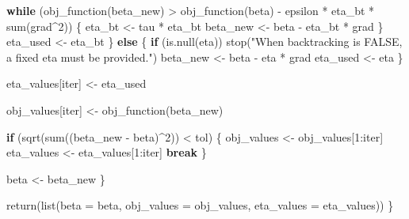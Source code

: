 \documentclass[
  letterpaper,
  DIV=11,
  numbers=noendperiod]{scrartcl}
\newenvironment{Shaded}{\begin{snugshade}}{\end{snugshade}}
\newcommand{\AttributeTok}[1]{\textcolor[rgb]{0.40,0.45,0.13}{#1}}
\newcommand{\ControlFlowTok}[1]{\textcolor[rgb]{0.00,0.23,0.31}{\textbf{#1}}}
\newcommand{\DecValTok}[1]{\textcolor[rgb]{0.68,0.00,0.00}{#1}}
\newcommand{\FunctionTok}[1]{\textcolor[rgb]{0.28,0.35,0.67}{#1}}
\newcommand{\NormalTok}[1]{\textcolor[rgb]{0.00,0.23,0.31}{#1}}
\newcommand{\OtherTok}[1]{\textcolor[rgb]{0.00,0.23,0.31}{#1}}
\newcommand{\SpecialCharTok}[1]{\textcolor[rgb]{0.37,0.37,0.37}{#1}}
\newcommand{\StringTok}[1]{\textcolor[rgb]{0.13,0.47,0.30}{#1}}
\begin{document}
\begin{Shaded}
\begin{Highlighting}[]
      \ControlFlowTok{while}\NormalTok{ (}\FunctionTok{obj\_function}\NormalTok{(beta\_new) }\SpecialCharTok{\textgreater{}} \FunctionTok{obj\_function}\NormalTok{(beta) }\SpecialCharTok{{-}}\NormalTok{ epsilon }\SpecialCharTok{*}\NormalTok{ eta\_bt }\SpecialCharTok{*} \FunctionTok{sum}\NormalTok{(grad}\SpecialCharTok{\^{}}\DecValTok{2}\NormalTok{)) \{}
\NormalTok{        eta\_bt }\OtherTok{\textless{}{-}}\NormalTok{ tau }\SpecialCharTok{*}\NormalTok{ eta\_bt}
\NormalTok{        beta\_new }\OtherTok{\textless{}{-}}\NormalTok{ beta }\SpecialCharTok{{-}}\NormalTok{ eta\_bt }\SpecialCharTok{*}\NormalTok{ grad}
\NormalTok{      \}}
\NormalTok{      eta\_used }\OtherTok{\textless{}{-}}\NormalTok{ eta\_bt}
\NormalTok{    \} }\ControlFlowTok{else}\NormalTok{ \{}
      \ControlFlowTok{if}\NormalTok{ (}\FunctionTok{is.null}\NormalTok{(eta)) }\FunctionTok{stop}\NormalTok{(}\StringTok{"When backtracking is FALSE, a fixed eta must be provided."}\NormalTok{)}
\NormalTok{      beta\_new }\OtherTok{\textless{}{-}}\NormalTok{ beta }\SpecialCharTok{{-}}\NormalTok{ eta }\SpecialCharTok{*}\NormalTok{ grad}
\NormalTok{      eta\_used }\OtherTok{\textless{}{-}}\NormalTok{ eta}
\NormalTok{    \}}
    
\NormalTok{    eta\_values[iter] }\OtherTok{\textless{}{-}}\NormalTok{ eta\_used}
    
\NormalTok{    obj\_values[iter] }\OtherTok{\textless{}{-}} \FunctionTok{obj\_function}\NormalTok{(beta\_new)}
    
    \ControlFlowTok{if}\NormalTok{ (}\FunctionTok{sqrt}\NormalTok{(}\FunctionTok{sum}\NormalTok{((beta\_new }\SpecialCharTok{{-}}\NormalTok{ beta)}\SpecialCharTok{\^{}}\DecValTok{2}\NormalTok{)) }\SpecialCharTok{\textless{}}\NormalTok{ tol) \{}
\NormalTok{      obj\_values }\OtherTok{\textless{}{-}}\NormalTok{ obj\_values[}\DecValTok{1}\SpecialCharTok{:}\NormalTok{iter]}
\NormalTok{      eta\_values }\OtherTok{\textless{}{-}}\NormalTok{ eta\_values[}\DecValTok{1}\SpecialCharTok{:}\NormalTok{iter]}
      \ControlFlowTok{break}
\NormalTok{    \}}
    
\NormalTok{    beta }\OtherTok{\textless{}{-}}\NormalTok{ beta\_new}
\NormalTok{  \}}
  
  \FunctionTok{return}\NormalTok{(}\FunctionTok{list}\NormalTok{(}\AttributeTok{beta =}\NormalTok{ beta, }\AttributeTok{obj\_values =}\NormalTok{ obj\_values, }\AttributeTok{eta\_values =}\NormalTok{ eta\_values))}
\NormalTok{\}}
\end{Highlighting}
\end{Shaded}
\end{document}
